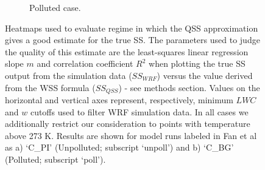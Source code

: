 \documentclass{article}
\begin{document}
\begin{figure}[ht]
\begin{subfigure}{1\textwidth}
		\caption{Polluted case.}
		\label{filtcritheatmapseppoll}
	\end{subfigure}
	\caption{Heatmaps used to evaluate regime in which the QSS approximation gives a good estimate for the true SS. The parameters used to judge the quality of this estimate are the least-squares linear regression slope $m$ and correlation coefficient $R^2$ when plotting the true SS output from the simulation data ($SS_{WRF}$) versus the value derived from the WSS formula ($SS_{QSS}$) - see methods section. Values on the horizontal and vertical axes represent, respectively, minimum $LWC$ and $w$ cutoffs used to filter WRF simulation data. In all cases we additionally restrict our consideration to points with temperature above 273 K. Results are shown for model runs labeled in Fan et al as a) `C\_PI' (Unpolluted; subscript `unpoll') and b) `C\_BG' (Polluted; subscript `poll').}
	\label{filtcritheatmapsep}
\end{figure}
\end{document}
